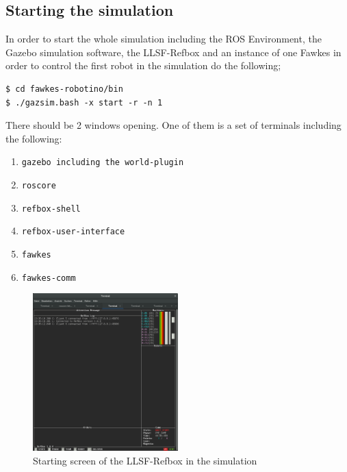 \documentclass[oribibl]{llncs}
\begin{document}
\subsection{Starting the simulation}
In order to start the whole simulation including the ROS Environment, the Gazebo simulation software, the LLSF-Refbox and an instance of one Fawkes in order to control the first robot in the simulation do the following;
\begin{lstlisting}[frame=single]
$ cd fawkes-robotino/bin
$ ./gazsim.bash -x start -r -n 1
\end{lstlisting}
There should be 2 windows opening. One of them is a set of terminals including the following:
\begin{enumerate}
        \item \texttt{gazebo including the world-plugin}
        \item \texttt{roscore}
        \item \texttt{refbox-shell}
        \item \texttt{refbox-user-interface}
        \item \texttt{fawkes}
        \item \texttt{fawkes-comm}
\end{enumerate}

\begin{figure}
        \centering
        \includegraphics[width=0.5\textwidth]{images/refbox_ui.png}
        \caption{Starting screen of the LLSF-Refbox in the simulation}
        \label{refboxui}
\end{figure}
\end{document}
